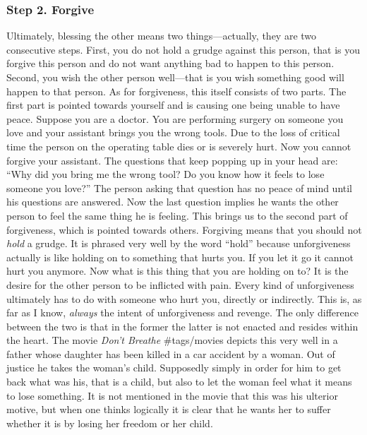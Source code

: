 \subsubsection{Step 2. Forgive} Ultimately, blessing the other means two
things---actually, they are two consecutive steps. First, you do not
hold a grudge against this person, that is you forgive this person and
do not want anything bad to happen to this person. Second, you wish the
other person well---that is you wish something good will happen to that
person. As for forgiveness, this itself consists of two parts. The first
part is pointed towards yourself and is causing one being unable to have
peace. Suppose you are a doctor. You are performing surgery on someone
you love and your assistant brings you the wrong tools. Due to the loss
of critical time the person on the operating table dies or is severely
hurt. Now you cannot forgive your assistant. The questions that keep
popping up in your head are: ``Why did you bring me the wrong tool? Do
you know how it feels to lose someone you love?'' The person asking that
question has no peace of mind until his questions are answered. Now the
last question implies he wants the other person to feel the same thing
he is feeling. This brings us to the second part of forgiveness, which
is pointed towards others. Forgiving means that you should not
\emph{hold} a grudge. It is phrased very well by the word ``hold''
because unforgiveness actually is like holding on to something that
hurts you. If you let it go it cannot hurt you anymore. Now what is this
thing that you are holding on to? It is the desire for the other person
to be inflicted with pain. Every kind of unforgiveness ultimately has to
do with someone who hurt you, directly or indirectly. This is, as far as
I know, \emph{always} the intent of unforgiveness and revenge. The only
difference between the two is that in the former the latter is not
enacted and resides within the heart. The movie \emph{Don't Breathe}
\#tags/movies depicts this very well in a father whose daughter has been
killed in a car accident by a woman. Out of justice he takes the woman's
child. Supposedly simply in order for him to get back what was his, that
is a child, but also to let the woman feel what it means to lose
something. It is not mentioned in the movie that this was his ulterior
motive, but when one thinks logically it is clear that he wants her to
suffer whether it is by losing her freedom or her child.


